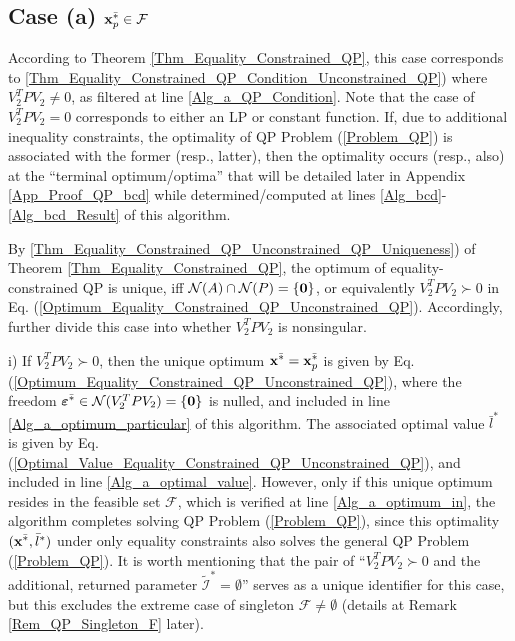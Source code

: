 \documentclass{imaman}
\newcommand{\bfx}{{\bf x}}
\newcommand{\bfvarepsilon}{{\boldsymbol \varepsilon}}
\newcommand{\bfzero}{{\bf 0}}
\newcommand{\calF}{{\mathcal F}}
\newcommand{\calI}{{\mathcal I}}
\newcommand{\calN}{{\mathcal N}}
\numberwithin{equation}{section}
\begin{document}
\vspace{-0.3cm}\subsection{Case (a) $\bfx_p^{\bar *}\in\calF$}
\label{App_Proof_QP_a}\vspace{-0.2cm}
According to Theorem \ref{Thm_Equality_Constrained_QP}, this case corresponds to \ref{Thm_Equality_Constrained_QP_Condition_Unconstrained_QP}) where $V_2^TPV_2\ne 0$, as filtered at line \ref{Alg_a_QP_Condition}. Note that the case of $V_2^TPV_2=0$ corresponds to either an LP or constant function. If, due to additional inequality constraints, the optimality of QP Problem (\ref{Problem_QP}) is associated with the former (resp., latter), then the optimality occurs (resp., also) at the ``terminal optimum/optima'' that will be detailed later in Appendix \ref{App_Proof_QP_bcd} while determined/computed at lines \ref{Alg_bcd}-\ref{Alg_bcd_Result} of this algorithm.

By \ref{Thm_Equality_Constrained_QP_Unconstrained_QP_Uniqueness}) of Theorem \ref{Thm_Equality_Constrained_QP}, the optimum of equality-constrained QP is unique, iff $\calN(A)\cap\calN(P)=\{\bfzero\}$, or equivalently $V_2^TPV_2\succ 0$ in Eq. (\ref{Optimum_Equality_Constrained_QP_Unconstrained_QP}). Accordingly, further divide this case into whether $V_2^TPV_2$ is nonsingular.\vspace{0.16cm}

\vspace{-0.1cm}\noindent i) If $V_2^TPV_2\succ 0$, then the unique optimum $\bfx^{\bar *}=\bfx_p^{\bar *}$ is given by Eq. (\ref{Optimum_Equality_Constrained_QP_Unconstrained_QP}), where the freedom $\bfvarepsilon^{\bar *}\in\calN(V_2^TPV_2)=\{\bfzero\}$ is nulled, and included in line \ref{Alg_a_optimum_particular} of this algorithm. The associated optimal value $\bar l^*$ is given by Eq. (\ref{Optimal_Value_Equality_Constrained_QP_Unconstrained_QP}), and included in line \ref{Alg_a_optimal_value}. However, only if this unique optimum resides in the feasible set $\calF$, which is verified at line \ref{Alg_a_optimum_in}, the algorithm completes solving QP Problem (\ref{Problem_QP}), since this optimality $(\bfx^{\bar *},\bar l^*)$ under only equality constraints also solves the general QP Problem (\ref{Problem_QP}). It is worth mentioning that the pair of ``$V_2^TPV_2\succ 0$ and the additional, returned parameter $\tilde\calI^*=\emptyset$'' serves as a unique identifier for this case, but this excludes the extreme case of singleton $\calF\ne\emptyset$ (details at Remark \ref{Rem_QP_Singleton_F} later).\vspace{0.16cm}
\end{document}
